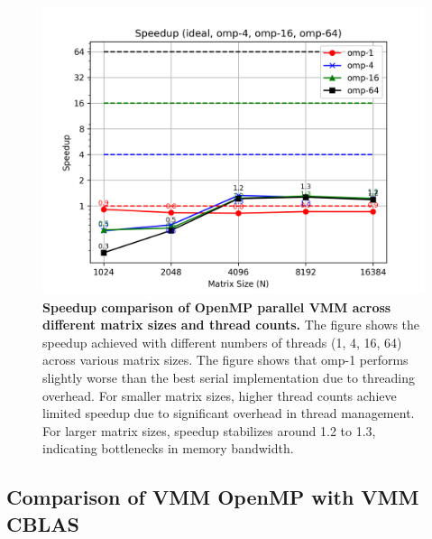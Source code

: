 \begin{figure}[htbp]
    \centering
    \includegraphics[width=1.0\linewidth]{images/Speedup.png}
    \caption{\textbf{Speedup comparison of OpenMP parallel VMM across different matrix sizes and thread counts.} The figure shows the speedup achieved with different numbers of threads (1, 4, 16, 64) across various matrix sizes. The figure shows that omp-1 performs slightly worse than the best serial implementation due to threading overhead. For smaller matrix sizes, higher thread counts achieve limited speedup due to significant overhead in thread management. For larger matrix sizes, speedup stabilizes around 1.2 to 1.3, indicating bottlenecks in memory bandwidth.}
    \label{fig:openmp-parallel-speedup}
\end{figure}

\subsection{Comparison of VMM OpenMP with VMM CBLAS}
\label{subsec:comparison-openmp-cblas}

